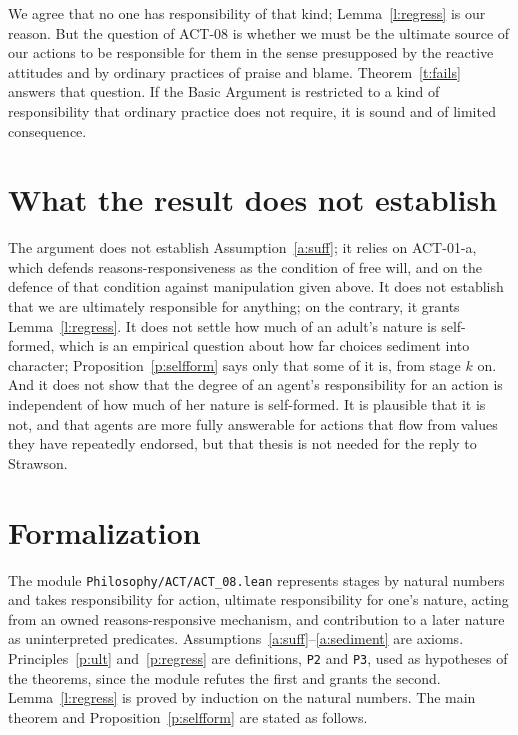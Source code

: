 \documentclass{situationist-preprint}
\begin{document}
\begin{reply}
We agree that no one has responsibility of that kind; Lemma~\ref{l:regress} is our reason. But the question of ACT-08 is whether we must be the ultimate source of our actions to be responsible for them in the sense presupposed by the reactive attitudes and by ordinary practices of praise and blame. Theorem~\ref{t:fails} answers that question. If the Basic Argument is restricted to a kind of responsibility that ordinary practice does not require, it is sound and of limited consequence.
\end{reply}

\section{What the result does not establish}

The argument does not establish Assumption~\ref{a:suff}; it relies on ACT-01-a, which defends reasons-responsiveness as the condition of free will, and on the defence of that condition against manipulation given above. It does not establish that we are ultimately responsible for anything; on the contrary, it grants Lemma~\ref{l:regress}. It does not settle how much of an adult's nature is self-formed, which is an empirical question about how far choices sediment into character; Proposition~\ref{p:selfform} says only that some of it is, from stage $k$ on. And it does not show that the degree of an agent's responsibility for an action is independent of how much of her nature is self-formed. It is plausible that it is not, and that agents are more fully answerable for actions that flow from values they have repeatedly endorsed, but that thesis is not needed for the reply to Strawson.

\section{Formalization}\label{s:formal}

The module \nolinkurl{Philosophy/ACT/ACT_08.lean} represents stages by natural numbers and takes responsibility for action, ultimate responsibility for one's nature, acting from an owned reasons-responsive mechanism, and contribution to a later nature as uninterpreted predicates. Assumptions~\ref{a:suff}--\ref{a:sediment} are axioms. Principles~\ref{p:ult} and~\ref{p:regress} are definitions, \texttt{P2} and \texttt{P3}, used as hypotheses of the theorems, since the module refutes the first and grants the second. Lemma~\ref{l:regress} is proved by induction on the natural numbers. The main theorem and Proposition~\ref{p:selfform} are stated as follows.
\end{document}
